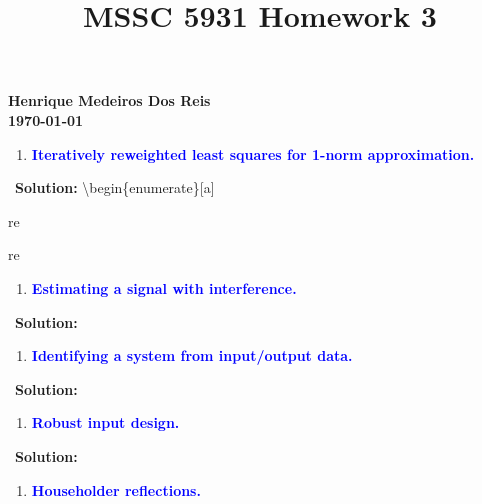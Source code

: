 \documentclass[
  11pt,
]{article}
\title{\vspace{-1.8cm} MSSC 5931 Homework 3}
\author{}
\date{\vspace{-2.5em}}
\providecommand{\tightlist}{%
  \setlength{\itemsep}{0pt}\setlength{\parskip}{0pt}}
\begin{document}
\maketitle

\begin{center}
\textbf{Henrique Medeiros Dos Reis}
\\
\textbf{\today}
\end{center}

\begin{enumerate}
\def\labelenumi{\arabic{enumi}.}
\tightlist
\item
  \textbf{\textcolor{blue}{Iteratively reweighted least squares for 1-norm approximation.}}
\end{enumerate}

\quad\quad~\textbf{Solution: } \textbackslash begin\{enumerate\}{[}a{]}

\item

re

\item

re

\begin{enumerate}
\def\labelenumi{\arabic{enumi}.}
\setcounter{enumi}{1}
\tightlist
\item
  \textbf{\textcolor{blue}{Estimating a signal with interference.}}
\end{enumerate}

\quad\quad~\textbf{Solution: }

\begin{enumerate}
\def\labelenumi{\arabic{enumi}.}
\setcounter{enumi}{2}
\tightlist
\item
  \textbf{\textcolor{blue}{Identifying a system from input/output data.}}
\end{enumerate}

\quad\quad~\textbf{Solution: }

\begin{enumerate}
\def\labelenumi{\arabic{enumi}.}
\setcounter{enumi}{3}
\tightlist
\item
  \textbf{\textcolor{blue}{Robust input design.}}
\end{enumerate}

\quad\quad~\textbf{Solution: }

\begin{enumerate}
\def\labelenumi{\arabic{enumi}.}
\setcounter{enumi}{4}
\tightlist
\item
  \textbf{\textcolor{blue}{Householder reflections.}}
\end{enumerate}
\end{document}
